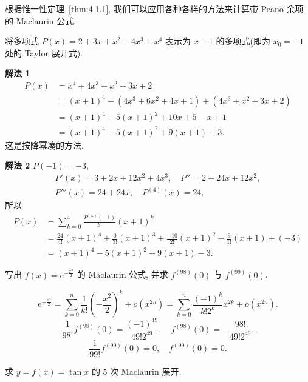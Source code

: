 根据惟一性定理~\ref{thm:4.1.1}, 我们可以应用各种各样的方法来计算带 Peano 余项的 Maclaurin 公式.

\begin{example}\label{ex:4.1.7}
将多项式 $P(x)=2+3x+x^{2}+4x^{3}+x^{4}$ 表示为 $x+1$ 的多项式(即为 $x_{0}=-1$ 处的 Taylor 展开式).
\end{example}

\begin{solution}
\textbf{解法 1}
\begin{align*}
P(x)&=x^{4}+4x^{3}+x^{2}+3x+2\\
&=(x+1)^{4}-(4x^{3}+6x^{2}+4x+1)+(4x^{3}+x^{2}+3x+2)\\
&=(x+1)^{4}-5(x+1)^{2}+10x+5-x+1\\
&=(x+1)^{4}-5(x+1)^{2}+9(x+1)-3.
\end{align*}
这是按降幂凑的方法.

\textbf{解法 2} $P(-1)=-3$,
\begin{gather*}
P'(x)=3+2x+12x^{2}+4x^{3},\quad P''=2+24x+12x^{2},\\
P'''(x)=24+24x,\quad P^{(4)}(x)=24,
\end{gather*}
所以
\begin{align*}
P(x)&=\sum_{k=0}^{4}\frac{P^{(k)}(-1)}{k!}(x+1)^{k}\\
&=\frac{24}{4!}(x+1)^{4}+\frac{0}{3!}(x+1)^{3}+\frac{-10}{2!}(x+1)^{2}+\frac{9}{1!}(x+1)+(-3)\\
&=(x+1)^{4}-5(x+1)^{2}+9(x+1)-3.
\end{align*}
\end{solution}

\begin{example}\label{ex:4.1.8}
写出 $f(x)=\mathrm{e}^{-\frac{x^{2}}{2}}$ 的 Maclaurin 公式, 并求 $f^{(98)}(0)$ 与 $f^{(99)}(0)$.
\end{example}

\begin{solution}
\[
\mathrm{e}^{-\frac{x^{2}}{2}}=\sum_{k=0}^{n}\frac{1}{k!}\left(-\frac{x^{2}}{2}\right)^{k}+o(x^{2n})=\sum_{k=0}^{n}\frac{(-1)^{k}}{k!2^{k}}x^{2k}+o(x^{2n}).
\]
\[
\frac{1}{98!}f^{(98)}(0)=\frac{(-1)^{49}}{49!2^{49}},\quad f^{(98)}(0)=-\frac{98!}{49!2^{49}}.
\]
\[
\frac{1}{99!}f^{(99)}(0)=0,\quad f^{(99)}(0)=0.
\]
\end{solution}

\begin{example}\label{ex:4.1.9}
求 $y=f(x)=\tan x$ 的 $5$ 次 Maclaurin 展开.
\end{example}

